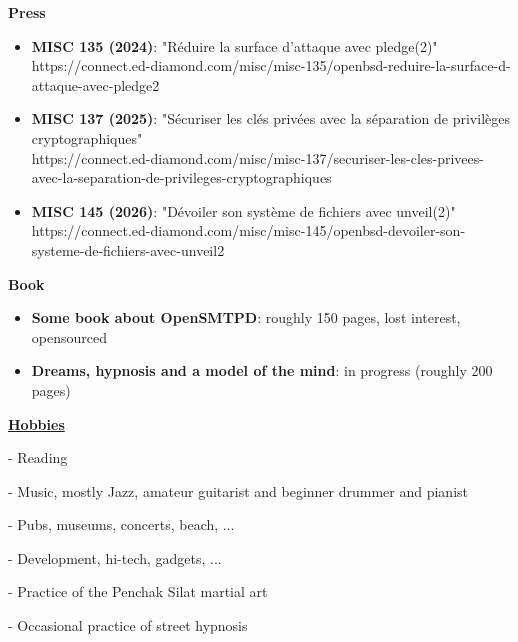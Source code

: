 \documentclass[a4paper,10pt]{letter}
\begin{document}
\textbf{Press}
\begin{itemize}
\item	\textbf{MISC 135 (2024)}: "R\'eduire la surface d'attaque avec pledge(2)"\\
  https://connect.ed-diamond.com/misc/misc-135/openbsd-reduire-la-surface-d-attaque-avec-pledge2\\
\item	\textbf{MISC 137 (2025)}: "S\'ecuriser les cl\'es priv\'ees avec la s\'eparation de privil\`eges cryptographiques"\\
  https://connect.ed-diamond.com/misc/misc-137/securiser-les-cles-privees-avec-la-separation-de-privileges-cryptographiques\\
\item	\textbf{MISC 145 (2026)}: "D\'evoiler son syst\`eme de fichiers avec unveil(2)"\\
  https://connect.ed-diamond.com/misc/misc-145/openbsd-devoiler-son-systeme-de-fichiers-avec-unveil2\\
\end{itemize}


\textbf{Book}
\begin{itemize}
\item	\textbf{Some book about OpenSMTPD}: roughly 150 pages, lost interest, opensourced
\item	\textbf{Dreams, hypnosis and a model of the mind}: in progress (roughly 200 pages)\\
\end{itemize}


\underline{\textbf{Hobbies}}\\
\begin{description}
\item - Reading
\item - Music, mostly Jazz, amateur guitarist and beginner drummer and pianist
\item - Pubs, museums, concerts, beach, ...
\item - Development, hi-tech, gadgets, ...
\item - Practice of the Penchak Silat martial art
\item - Occasional practice of street hypnosis\\
\end{description}
\end{document}
